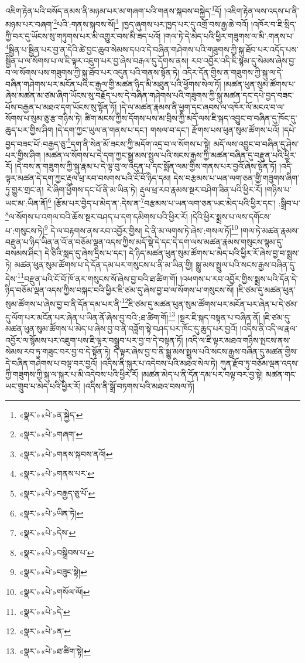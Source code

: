 འཇིག་རྟེན་པའི་བསོད་ནམས་ནི་མཉམ་པར་མ་གཞག་པའི་གནས་སྐབས་བསྐྱེད་\footnote{«སྣར་»«པེ་»ན་སྐྱེད་}དོ། །འཇིག་རྟེན་ལས་འདས་པ་ནི་མཉམ་པར་བཞག་\footnote{«སྣར་»«པེ་»གཞག་}པའི་:གནས་སྐབས་སོ།\footnote{«སྣར་»«པེ་»གནས་སྐབས་ནའོ།} །ཁྱད་ཞུགས་པར་ཁྱད་པར་དུ་འགྲོ་བས་རྒྱ་ཆེ་བའོ། །འཁོར་བ་ཇི་སྲིད་ཀྱི་བར་དུ་ཡོངས་སུ་གཏུགས་པར་མི་འགྱུར་བས་མི་ཟད་པའོ། །གལ་ཏེ་དེ་མེད་པའི་ཕྱིར་གཟུགས་ལ་མི་:གནས་པ་\footnote{«སྣར་»«པེ་»གནས་པར་}སྦྱིན་པ་སྦྱིན་པར་བྱ་ན་དེའི་ཚེ་བྱང་ཆུབ་སེམས་དཔའ་དེ་བཞིན་གཤེགས་པའི་གཟུགས་ཀྱི་སྐུ་ཐོབ་པར་འདོད་པས་སྦྱིན་པ་ལ་སོགས་པ་ལ་ཇི་ལྟར་འཇུག་པར་བྱ་ཞེས་བརྒལ་དུ་དོགས་ནས། རབ་འབྱོར་འདི་ཇི་སྙམ་དུ་སེམས་ཞེས་བྱ་བ་ལ་སོགས་པས་གཟུགས་ཀྱི་སྐུ་ཐོབ་པར་འདུན་པའི་གནས་སྟོན་ཏེ། འདིར་དོན་གྱིས་ན་གཟུགས་ཀྱི་སྐུ་ལ་དེ་བཞིན་གཤེགས་པར་མངོན་པའི་ང་རྒྱལ་གྱི་མཚན་ཉིད་མི་མཐུན་པའི་ཕྱོགས་སེལ་ཏོ། །མཚན་ཕུན་སུམ་ཚོགས་པ་ཞེས་མཚན་མ་ཙམ་ཞིག་ཡོངས་སུ་བརྗོད་པས་དེ་བཞིན་གཤེགས་པའི་གཟུགས་ཀྱི་སྐུ་མཚན་དང་དཔེ་བྱད་བཟང་པོས་བརྒྱན་པ་མཐའ་དག་ཡོངས་སུ་སྟོན་ཏོ། །དེ་ལ་མཚན་རྣམས་ནི་ཕྱག་དང་ཞབས་ལ་འཁོར་ལོ་མངའ་བ་ལ་སོགས་པ་སུམ་ཅུ་རྩ་གཉིས་ཏེ། ཚིག་མངས་ཀྱིས་དོགས་པས་མ་བྲིས་ཀྱི་མདོ་ལས་ཇི་སྐད་འབྱུང་བ་བཞིན་དུ་ཁོང་དུ་ཆུད་པར་གྱིས་ཤིག །དེ་དག་ཀྱང་ཡུལ་ན་གནས་པ་དང་། གསལ་བ་དང་། རྫོགས་པས་ཕུན་སུམ་ཚོགས་པའོ། །དཔེ་བྱད་བཟང་པོ་:བརྒྱད་ཅུ་\footnote{«སྣར་»«པེ་»བརྒྱད་ཅུ་པོ་}དག་ནི་སེན་མོ་ཟངས་ཀྱི་མདོག་འདྲ་བ་ལ་སོགས་པ་སྟེ། མདོ་ལས་འབྱུང་བ་བཞིན་དུ་ཤེས་པར་གྱིས་ཤིག །མཚན་ལ་སོགས་པ་དེ་དག་ཀྱང་སྒྱུ་མས་སྤྲུལ་པའི་སངས་རྒྱས་ཀྱི་མཚན་བཞིན་དུ་བརྫུན་པའི་ཕྱིར་རོ། །དེ་བས་ན་གཟུགས་ཀྱི་སྐུ་རྣམ་པ་དེ་ལྟ་བུ་ལ་འདུན་པ་དང་སྨོན་ལམ་གྱིས་གནས་པར་བྱའོ་ཞེས་སྟོན་ཏོ། །འདི་ལྟར་མཚན་དེ་དག་ཀྱང་རྡུལ་ཕྲ་རབ་བསགས་པའི་ངོ་བོ་ཉིད་དམ། དེས་བརྩམས་པ་ཡན་ལག་ཅན་གྱི་གཟུགས་ཞིག་ཏུ་གྱུར་གྲང་ན། རེ་ཞིག་ཕྱོགས་དང་པོ་ནི་མ་ཡིན་ཏེ། རྡུལ་ཕྲ་རབ་རྣམས་སྔར་བཤིག་ཟིན་པའི་ཕྱིར་རོ། །གཉིས་པ་ཡང་མ་:ཡིན་ནོ།\footnote{«སྣར་»«པེ་»ཡིན་ཏེ།} །རྩོམ་པར་བྱེད་པ་མེད་ན་:དེས་ན་\footnote{«སྣར་»«པེ་»དེས་}བརྩམས་པ་ཡན་ལག་ཅན་ཡང་མེད་པའི་ཕྱིར་དང་། :སྒྲིབ་པ་\footnote{«སྣར་»«པེ་»བསྒྲིབས་པ་}ལ་སོགས་པ་འགལ་བའི་ཆོས་སྔར་བཤད་པ་དག་དམིགས་པའི་ཕྱིར་རོ། །དེའི་ཕྱིར་སྨྲས་པ་ལས་དགོངས་པ་:གསུངས་ཏེ།\footnote{«སྣར་»«པེ་»བཟུང་སྟེ།} དེ་ལ་བརྟགས་ནས་རབ་འབྱོར་གྱིས། དེ་ནི་མ་ལགས་ཏེ་ཞེས་:གསལ་ཏོ།\footnote{«སྣར་»«པེ་»གསོལ་ལོ།} །གལ་ཏེ་མཚན་རྣམས་བརྫུན་པ་ཉིད་ཡིན་ན་འོ་ན་བཅོམ་ལྡན་འདས་ཀྱིས་མདོ་སྡེ་དེ་དང་དེ་དག་ལས་མཚན་རྣམས་གསུངས་སྙམ་དུ་བསམས་ཤིང་། དེ་ཅིའི་སླད་དུ་ཞེས་དྲིས་པ་དང་། དེ་ཉིད་མཚན་ཕུན་སུམ་ཚོགས་པ་མེད་པའི་ཕྱིར་རོ་ཞེས་བྱ་བ་སྨྲས་ཏེ། མཚན་ཕུན་སུམ་ཚོགས་པ་དེ་དོན་དམ་པར་གསུངས་པ་ནི་མ་ཡིན་གྱི། སྒྱུ་མས་སྤྲུལ་པའི་སངས་རྒྱས་བཞིན་དུ་དེས་\footnote{«སྣར་»«པེ་»དེ་}བརྫུན་པའི་ངོ་བོ་ཁོ་ནར་གསུངས་སོ་ཞེས་བྱ་བའི་ཐ་ཚིག་གོ། །འཕགས་པ་རབ་འབྱོར་གྱིས་སྨྲས་པའི་དོན་དེ་ཉིད་བཅོམ་ལྡན་འདས་ཀྱིས་བསྐང་བའི་ཕྱིར་ཇི་ཙམ་དུ་ཞེས་བྱ་བ་ལ་སོགས་པ་གསུངས་སོ། །ཇི་ཙམ་དུ་མཚན་ཕུན་སུམ་ཚོགས་པ་ཞེས་བྱ་བ་ནི་དོན་དམ་པར་ནི་\footnote{«སྣར་»«པེ་»ན་}ཇི་ཙམ་དུ་མཚན་ཕུན་སུམ་ཚོགས་པར་མངོན་པར་ཞེན་པ་དེ་ཙམ་དུ་ལོག་པར་མངོན་པར་ཞེན་པ་ཡིན་ནོ་ཞེས་བྱ་བའི་:ཐ་ཚིག་གོ།\footnote{«སྣར་»«པེ་»ཐ་ཚིག་སྟེ།} །སྔར་ཇི་སྐད་བསྟན་པ་བཞིན་ནོ། །ཇི་ཙམ་དུ་མཚན་ཕུན་སུམ་ཚོགས་པ་མེད་པ་ཞེས་བྱ་བ་ནི་བཟློག་སྟེ་བཤད་པར་ཁོང་དུ་ཆུད་པར་བྱའོ། །འདིས་ནི་འདི་ལ་རྣལ་འབྱོར་ལ་སྙོམས་པར་འཇུག་པས་ཇི་ལྟར་བསྒྲུབ་པར་བྱ་བ་དེ་བསྟན་ཏོ། །འདི་ལ་ཇི་ལྟར་མཐའ་གཉིས་སྤངས་ནས་སེམས་རབ་ཏུ་གཟུང་བར་བྱ་བ་དེ་སྟོན་ཏེ། དེ་ལྟར་ཞེས་བྱ་བ་ནི་སྒྱུ་མས་སྤྲུལ་པའི་སངས་རྒྱས་བཞིན་དུ་མཚན་གྱིས་དེ་བཞིན་གཤེགས་པ་བལྟ་བར་བྱའོ། །འདིས་ནི་སྐུར་པ་འདེབས་པའི་མཐའ་སེལ་ཏེ། ཀུན་རྫོབ་ཏུ་བཅོམ་ལྡན་འདས་ཀྱི་གཟུགས་ཀྱི་སྐུ་ལ་སྐུར་པ་མི་འདེབས་པའི་ཕྱིར་རོ། །མཚན་མེད་པ་ནི་དོན་དམ་པར་བལྟ་བར་བྱ་སྟེ། མཚན་གང་ཡང་གྲུབ་པ་མེད་པའི་ཕྱིར་རོ། །འདིས་ནི་སྒྲོ་བཏགས་པའི་མཐའ་བསལ་ཏོ། 